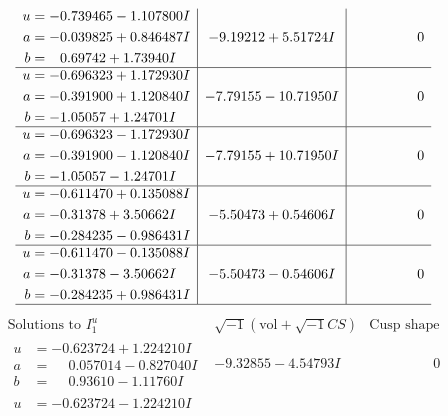 \documentclass[1p]{elsarticle_modified}
\theoremstyle{definition}
\newcommand{\I}{\sqrt{-1}}
\begin{document}
$$\begin{array}{c|c|c}
\begin{aligned}
u &= -0.739465 - 1.107800 I \\
a &= -0.039825 + 0.846487 I \\
b &= \phantom{-}0.69742 + 1.73940 I\end{aligned}
 & -9.19212 + 5.51724 I & \phantom{-0.000000 } 0 \\ \hline\begin{aligned}
u &= -0.696323 + 1.172930 I \\
a &= -0.391900 + 1.120840 I \\
b &= -1.05057 + 1.24701 I\end{aligned}
 & -7.79155 - 10.71950 I & \phantom{-0.000000 } 0 \\ \hline\begin{aligned}
u &= -0.696323 - 1.172930 I \\
a &= -0.391900 - 1.120840 I \\
b &= -1.05057 - 1.24701 I\end{aligned}
 & -7.79155 + 10.71950 I & \phantom{-0.000000 } 0 \\ \hline\begin{aligned}
u &= -0.611470 + 0.135088 I \\
a &= -0.31378 + 3.50662 I \\
b &= -0.284235 - 0.986431 I\end{aligned}
 & -5.50473 + 0.54606 I & \phantom{-0.000000 } 0 \\ \hline\begin{aligned}
u &= -0.611470 - 0.135088 I \\
a &= -0.31378 - 3.50662 I \\
b &= -0.284235 + 0.986431 I\end{aligned}
 & -5.50473 - 0.54606 I & \phantom{-0.000000 } 0\\
 \hline 
 \end{array}$$\newpage$$\begin{array}{c|c|c}  
\text{Solutions to }I^u_{1}& \I (\text{vol} + \sqrt{-1}CS) & \text{Cusp shape}\\
 \hline 
\begin{aligned}
u &= -0.623724 + 1.224210 I \\
a &= \phantom{-}0.057014 - 0.827040 I \\
b &= \phantom{-}0.93610 - 1.11760 I\end{aligned}
 & -9.32855 - 4.54793 I & \phantom{-0.000000 } 0 \\ \hline\begin{aligned}
u &= -0.623724 - 1.224210 I \\

\end{aligned}
\end{array}$$
\end{document}
